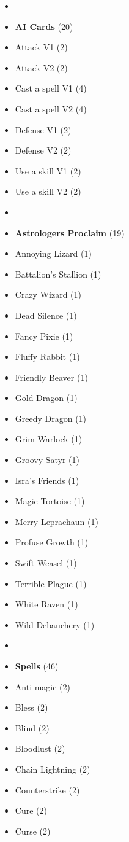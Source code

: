 \begin{multicols*}{3}
\begin{itemize}[leftmargin=0pt, label={}, noitemsep]
  \item
  \item \textbf{AI Cards} (20)
  \item Attack V1 (2)
  \item Attack V2 (2)
  \item Cast a spell V1 (4)
  \item Cast a spell V2 (4)
  \item Defense V1 (2)
  \item Defense V2 (2)
  \item Use a skill V1 (2)
  \item Use a skill V2 (2)
  \item
  \item \textbf{Astrologers Proclaim} (19)
  \item Annoying Lizard (1)
  \item Battalion's Stallion (1)
  \item Crazy Wizard (1)
  \item Dead Silence (1)
  \item Fancy Pixie (1)
  \item Fluffy Rabbit (1)
  \item Friendly Beaver (1)
  \item Gold Dragon (1)
  \item Greedy Dragon (1)
  \item Grim Warlock (1)
  \item Groovy Satyr (1)
  \item Isra's Friends (1)
  \item Magic Tortoise (1)
  \item Merry Leprachaun (1)
  \item Profuse Growth (1)
  \item Swift Weasel (1)
  \item Terrible Plague (1)
  \item White Raven (1)
  \item Wild Debauchery (1)
  \item
  \item \textbf{Spells} (46)
  \item Anti-magic (2)
  \item Bless (2)
  \item Blind (2)
  \item Bloodlust (2)
  \item Chain Lightning (2)
  \item Counterstrike (2)
  \item Cure (2)
  \item Curse (2)

\end{itemize}
\end{multicols*}
